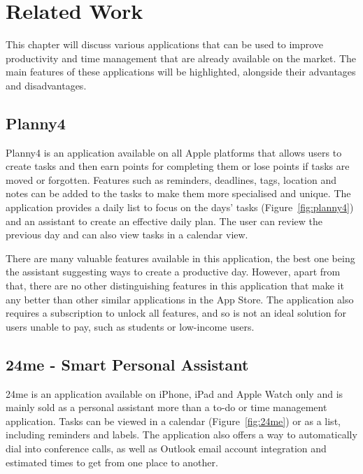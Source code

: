 	    \section{Related Work}
	        \label{sec:background_research_related_work}
	        
	        This chapter will discuss various applications that can be used to improve productivity and time management that are already available on the market.  The main features of these applications will be highlighted, alongside their advantages and disadvantages.
	        
	        \subsection{Planny4}
	        Planny4\cite{reutter_2020} is an application available on all Apple platforms that allows users to create tasks and then earn points for completing them or lose points if tasks are moved or forgotten.  Features such as reminders, deadlines, tags, location and notes can be added to the tasks to make them more specialised and unique.  The application provides a daily list to focus on the days' tasks (Figure~\ref{fig:planny4}) and an assistant to create an effective daily plan.  The user can review the previous day and can also view tasks in a calendar view.
	        
	        
	        
	        There are many valuable features available in this application, the best one being the assistant suggesting ways to create a productive day.  However, apart from that, there are no other distinguishing features in this application that make it any better than other similar applications in the App Store.  The application also requires a subscription to unlock all features, and so is not an ideal solution for users unable to pay, such as students or low-income users.
	        
	        \subsection{24me - Smart Personal Assistant}
	        
	        24me\cite{24me} is an application available on iPhone, iPad and Apple Watch only and is mainly sold as a personal assistant more than a to-do or time management application.  Tasks can be viewed in a calendar (Figure~\ref{fig:24me}) or as a list, including reminders and labels.  The application also offers a way to automatically dial into conference calls, as well as Outlook email account integration and estimated times to get from one place to another.
	        
